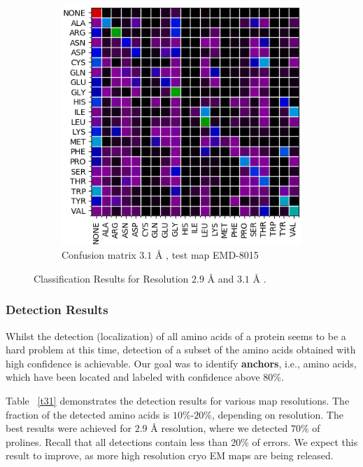 \begin{figure}[!ht]
\begin{minipage}[b]{0.45\linewidth}
\begin{subfigure}[b]{\linewidth}
	\includegraphics[width=1.0\textwidth]{pics/CM_31_RR.png}
	\caption{Confusion matrix $3.1$ {\AA}  , test map EMD-8015}
	\label{f:CM_31_RR}
\end{subfigure}
\end{minipage}
\caption{Classification Results for Resolution $2.9$ {\AA}   and $3.1$ {\AA} . }
\vspace{-3mm}
\end{figure}

\subsubsection{Detection Results}
Whilst the detection (localization) of all amino acids of a protein seems to be a hard problem at this time, detection of a subset of the amino acids obtained with high confidence is achievable. 
Our goal was to  identify \textbf{anchors}, i.e., amino acids, which have been located and labeled with confidence above $80 \%$. 



Table  ~\ref{t31} demonstrates the detection results for various map resolutions.
The fraction of the detected  amino acids is  $10 \%$-$20\%$, depending on resolution.
The best results were achieved for  $2.9$ {\AA}  resolution, where we detected $70 \%$ of prolines.
Recall that all detections contain less than $20 \%$ of errors.
We expect this result to improve, as more high resolution cryo EM maps are being released.


